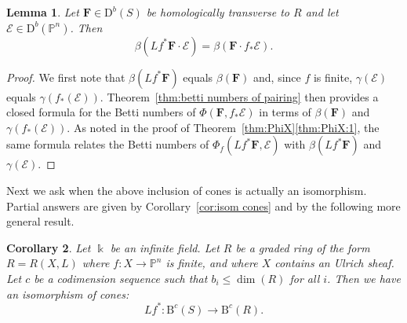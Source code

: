 \documentclass[12pt]{amsart}
\newtheorem{lemma}{Lemma}[section]
\newtheorem{cor}[lemma]{Corollary}
\theoremstyle{definition}
\theoremstyle{remark}
\newcommand{\kk}{\Bbbk}
\newcommand{\PP}{\mathbb{P}}
\newcommand{\cc}{c}
\newcommand{\cE}{\mathcal{E}}
\newcommand{\FF}{\mathbf{F}}
\newcommand{\DD}{\mathrm{D}}
\newcommand{\BBQ}{\mathrm{B}}
\begin{document}
\begin{lemma}\label{lem:general pairing}
Let $\FF\in \DD^b(S)$ be homologically transverse to $R$ and let $\cE\in \DD^b(\PP^n)$.  Then
\[
\beta(Lf^*\FF\cdot \cE)=\beta(\FF\cdot f_*\cE).
\]
\end{lemma}
\begin{proof}
We first note that $\beta(Lf^*\FF)$ equals $\beta(\FF)$ and, since $f$ is finite, $\gamma(\cE)$ equals $\gamma(f_*(\cE))$.  Theorem~\ref{thm:betti numbers of pairing} then provides a closed formula for the Betti numbers of $\Phi(\FF,f_*\cE)$ in terms of $\beta(\FF)$ and $\gamma(f_*(\cE))$.  As noted in the proof of Theorem~\ref{thm:PhiX}\eqref{thm:PhiX:1}, the same formula relates the Betti numbers of $\Phi_f(Lf^*\FF,\cE)$ with  $\beta(Lf^*\FF)$ and $\gamma(\cE)$.
\end{proof}

Next we ask when the above inclusion of cones is actually an isomorphism. Partial answers are given by Corollary~\ref{cor:isom cones} and by the following more general result.

\begin{cor}\label{cor:new graded rings}
Let $\kk$ be an infinite field.  Let $R$ be a graded ring of the form $R=R(X,L)$ where $f\colon X\to \PP^n$ is finite, and where $X$ contains an Ulrich sheaf.  Let $\cc$ be a codimension sequence such that $b_i\leq \dim(R)$ for all $i$.  Then we have  an isomorphism of cones:
\[
Lf^*\colon \BBQ^{\cc}(S)\to \BBQ^{\cc}(R).
\]
\end{cor}
\end{document}
